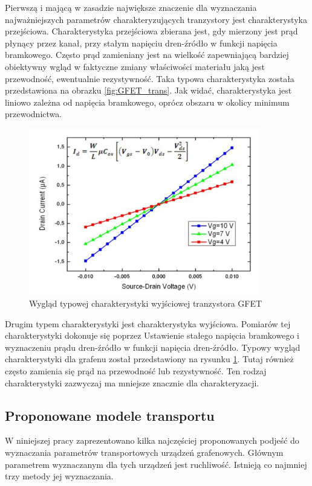Pierwszą i mającą w zasadzie największe znaczenie dla wyznaczania najważniejszych parametrów charakteryzujących tranzystory 
jest charakterystyka przejściowa. Charakterystyka przejściowa zbierana jest, gdy mierzony jest prąd płynący przez kanał, 
przy stałym napięciu dren-źródło w funkcji napięcia bramkowego. Często prąd zamieniany jest na wielkość zapewniającą
bardziej obiektywny wgląd w faktyczne zmiany właściwości materiału jaką jest przewodność, ewentualnie rezystywność. 
Taka typowa charakterystyka została przedstawiona na obrazku \ref{fig:GFET_trans}. Jak widać, charakterystyka jest liniowo 
zależna od napięcia bramkowego, oprócz obszaru w okolicy minimum przewodnictwa. 


	\begin{figure}[ht]
	\centering
	\includegraphics[width=0.90\textwidth]{./Rozdzial_3/obrazki/charakterystykaWyj.jpg}
	\caption{Wygląd typowej charakterystyki wyjściowej tranzystora GFET}
	\label{fig:GFET_out} 
	\end{figure}

Drugim typem charakterystyki jest charakterystyka wyjściowa. Pomiarów tej charakterystyki dokonuje się poprzez 
Ustawienie stałego napięcia bramkowego i wyznaczeniu prądu dren-źródło w funkcji napięcia dren-źródło. Typowy wygląd 
charakterystyki dla grafenu został przedstawiony na rysunku \ref{fig:GFET_out}. Tutaj również często zamienia się prąd na
przewodność lub rezystywność. Ten rodzaj charakterystyki zazwyczaj ma mniejsze znacznie dla charakteryzacji.

\subsection{Proponowane modele transportu}
W niniejszej pracy zaprezentowano kilka najczęściej proponowanych podjeść do wyznaczania parametrów transportowych urządzeń
grafenowych. Głównym parametrem wyznaczanym dla tych urządzeń jest ruchliwość. Istnieją co najmniej trzy metody jej 
wyznaczania. 
